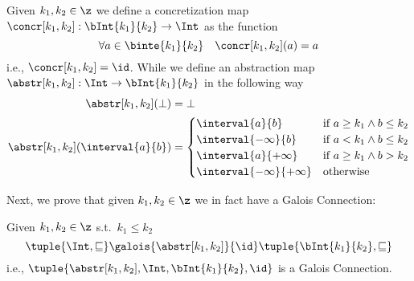\begin{definition}\label{def:abstrcons}
  Given \(k_1, k_2\in\z\) we define a concretization map
  \(\concr[k_1,k_2] : \bInt{k_1}{k_2} \to \Int\) as the function
  \begin{equation*}
    \forall a \in \binte{k_1}{k_2} \quad \concr[k_1,k_2](a) = a
  \end{equation*}
  i.e., \(\concr[k_1,k_2] = \id\). While we define an abstraction map
  \(\abstr[k_1, k_2] : \Int \to \bInt{k_1}{k_2}\) in the following way
  \begin{align*}
    \abstr[k_1,k_2](\bot) & = \bot \\
    \abstr[k_1,k_2](\interval{a}{b}) & =
                                       \begin{cases}
                                         \interval{a}{b} & \text{if } a \geq k_1 \wedge b \leq k_2 \\
                                         \interval{-\infty}{b} & \text{if } a < k_1 \wedge b \leq k_2 \\
                                         \interval{a}{+\infty} & \text{if } a \geq k_1 \wedge b > k_2 \\
                                         \interval{-\infty}{+\infty} & \text{otherwise}
                                       \end{cases}
  \end{align*}
\end{definition}

Next, we prove that given \(k_1, k_2\in\z\) we in fact have a Galois
Connection:

\begin{lemma}
  Given \(k_1, k_2 \in \z\) s.t.~\({k_1 \leq k_2}\)
  \begin{equation*}
    \tuple{\Int, \sqsubseteq} \galois{\abstr[k_1, k_2]}{\id} \tuple{\bInt{k_1}{k_2}, \sqsubseteq}
  \end{equation*}
  i.e., \(\tuple{\abstr[k_1, k_2], \Int, \bInt{k_1}{k_2}, \id}\) is
  a Galois Connection.
\end{lemma}


